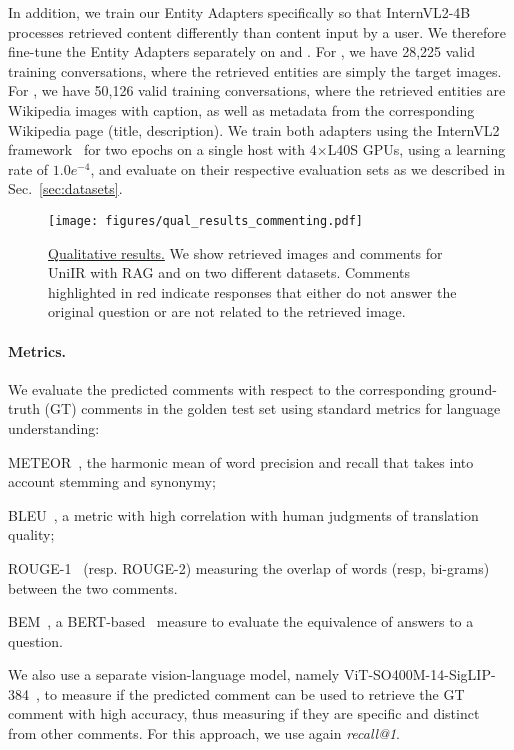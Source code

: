 In addition, we train our Entity Adapters specifically so that InternVL2-4B processes retrieved content differently than content input by a user.
We therefore fine-tune the Entity Adapters separately on \cirrcomment and \wikicomment.
%
For \cirrcomment, we have 28,225 valid training conversations, where the retrieved entities are simply the target images.
For \wikicomment, we have 50,126 valid training conversations, where the retrieved entities are Wikipedia images with caption, as well as metadata from the corresponding Wikipedia page (title, description).
We train both adapters using the InternVL2 framework~\cite{chen2024internvl} for two epochs on a single host with 4$\times$L40S GPUs, using a learning rate of $1.0e^{-4}$, and evaluate on their respective evaluation sets as we described in Sec.~\ref{sec:datasets}.
%

\begin{figure*}
  \centering
   \texttt{[image: figures/qual\_results\_commenting.pdf]}
   \caption{\underline{Qualitative results.} We show retrieved images and comments for UniIR with RAG and \modelname on two different datasets. Comments highlighted in red indicate responses that either do not answer the original question or are not related to the retrieved image. }
   \label{fig:qualitative_commenting}
\end{figure*}

\paragraph{Metrics.}
We evaluate the predicted comments with respect to the corresponding ground-truth (GT) comments in the golden test set using standard metrics for language understanding: \begin{enumerate*}[\roman*)]
\item METEOR~\cite{denkowski:lavie:meteor-wmt:2014}, the harmonic mean of word precision and recall that takes into account stemming and synonymy;
%
\item BLEU~\cite{10.3115/1073083.1073135}, a metric with high correlation with human judgments of translation quality;
\item ROUGE-1~\cite{lin2004rouge} (resp. ROUGE-2) measuring the overlap of words (resp, bi-grams) between the two comments.
\item BEM~\cite{bem-emnlp2022}, a BERT-based~\cite{bert-2018} measure to evaluate the equivalence of answers to a question.
\end{enumerate*}
%
We also use a separate vision-language model, namely ViT-SO400M-14-SigLIP-384~\cite{zhai2023sigmoid}, to measure if the predicted comment can be used to retrieve the GT comment with high accuracy, thus measuring if they are specific and distinct from other comments.
For this approach, we use again \emph{recall@1}. %


